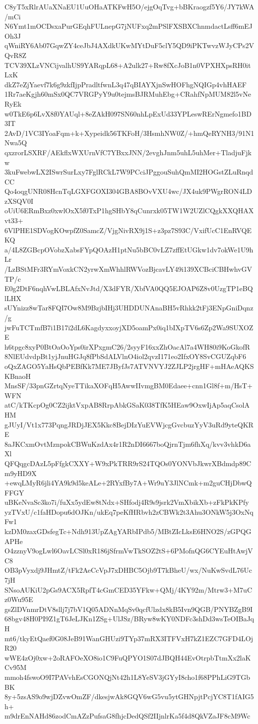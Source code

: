 C8yT5xRlrAUaXNaEU1UuOHaATKFwH5O/ejgOqTvg+bBKraogzf5Y6/JY7kWA/mCi
N6Ymt1mOCDsxaPurGEqhFULnepG7jNUFxq2mPSlFXSBXChnmdactLsff6mEJOh3J
qWniRY6Ab07GqwZY4ceJbJ4AXdkUKwMYtDuF5clY5QD9iPKTwvzWJyCPs2VQvR8Z
TCV39XLzVNCijvalhUS9YARqpL68+A2ulk27+Rw8fXcJoB1n0VPXHXpsRH0itLxK
dkZ7eZjYaevf7k6g9zkfIjpPradltfwnL3q47qBIAYXjnSwHOFhgNQIGp4vhHAEF
1Rr7aeKgjh60mSx0QC7VRGPyY9u0tejmsBJRMuhEbg+CRahfNpMUM82l5vNeRyEk
w0TkE6p6LvX8f0YAUql+8eZAkH097SN60nhLpExUd33YPLeswRErNgmefo1BD3IT
2AvD/1VC3IYoaFqm+k+Xypeidk56TKFoH/3HsmhNW0Z/+hmQeRYNH3/91N1Nwa5Q
qxzrorLSXRF/AEkflxWXUrnVfC7YBxxJNN/2evghJnm5uhL5uhMer+TladjuFjkw
3kuFwebwLX2ISwrSurLxy7FglRCkL7W9PCciJPggouSuhQmMI2HOGstZLuRnqdCC
Qo4oqgUNR08HcnTqLGXFGOXI304GBA8BOvVXU4wc/JX4uk9PWgrRON4LDzXSQV0I
oUiU6ERmBxz0xwlOxX5f0TxP1hgSHbY8qCunrxk05TW1W2UZlCQgkXXQHAXvt33+
6VlPHE1SDVogKOwpfZ0SamcZ/VjgNivRX9j1S+z3pz7S93C/VxifUcC1EnRVQEKQ
a/4L8ZGBcpOVobzXabsFYpQOAzH1ptNu5bBC0vLZ7zffEtUGkw1dv7okWe1U9hLr
/LzBStMFr3RYmVoxkCN2yrwXmWhhlRWVozBjcavLY49i139XCBciCBHwhvGVTP/c
E0g2DtF6nqhVwLBLAfxNvJtd/X3dFYR/XbfVA0QQ5EJOAP6Z8v0UzgTP1eBQlLHX
sUYnizz8wTar8FQI7Ow8M9BzjbIHj3UHDDUNAnaBH5vRhkk2tFj3ENpGniDqnz/g
jwFuTCTmfB7i1B17i2dL6KagdyxxoyjXD5oamPx0iq1bIXpTV6s6Zp2Wa9SUXOZE
h6tpgc8xyP0BtOaOoYps0irXPxgmC26/2syyF16xxZhOacAl7a4WH80i9KoGkofR
8NlEUdvdpBt1yjJnuHGJq8fPbSdALVlnO4iol2qvzI171eo2IfxOY8SvCGUZqbF6
oQxZAGO5YaHsQbPEBfKk7ME7JByfJs7ATVNVYJ2ZJLP2jrgHF+mHAeAQKSKBnaoH
MnsSF/33pnGZrtqNyeTTikaXOFqH5AwwIIvmgBM0Edaee+cnn1Gl8f+m/HsT+WFN
atC/kTKcpOg0CZ2ijktVxpAB8RrpAbkGSaK038TfK5HEaw9OxwIjAp5aqCsolAHM
gJUyI/Vt1x773PqngJRDjJEX5Kkc8BejDIzYuEVWjcgGvcbuzYyV3uRd9yteQKRE
8aJKCxmOvtMznpokCBWuKzdAx4r1R2nDI6667boQjrnTjm6fhXq/kvv3vhkD6aXl
QFQqgcDAzL5pFfgkCXXY+W9xPkTRR9rS24TQOs0YONVbJkwrXBdmdp89Cm9yHD9X
+ewqLMyR6jli4YA9k9d5keALe+2RYxfBy7A+Wr9uY3JlNCmk+m2guCHjDbwQFFGY
uBKeNvaSc3ko7i/fuXx5ydEw8tNdx+SHfodj4R9s9jsrk2VmXbikXb+zFkPkKPfy
yzTVxU/c1faHDopu6dOJKn/ukEq7peKfHRbvh2zCBWk2t3Ahu3ONkW5j3OxNqFw1
kzDM0zaxGDsfegTc+Ndh913UpZAgYARbIPdb5/MBtZIcLksE6HNO2S/zGPQGAPHe
O4zznyV9ogLwl6OavLCSl0xR186jSfrmVwTkSOZ2tS+6PMofnQG6CYEuHtAwjVC8
OB3pVyxdj9JHmtZ/tFk2AeCcVpJ7xDHBC5Ojb9T7kBheU/wx/NuKwSvdL76Uc7jH
SNsoAUKiU2pGs9ACX5RpfT4cGmCED35YFkw+QMj/4KY92m/Mtrw3+M7uCz0Wu95E
gsZlDVnmrDtV8sllj7j7bV1Q05ADNnMqSv0qcfUlzdx8kB5Ivn9QGB/PNYBZgB9I
68bgv48H0PI9Z1gT6JeLJKn1ZSg+UlJSz/BRyw8wKY0NDFc3shDd3wsTeOIBaJqH
mt6/tkyEtQaef0G08JeB91WanGHUzi9TYp37mRX3ITFVxH7kZ1EZC7GFD4LOjR20
wWE4zOj0xw+2oRAFOeXO8io1C9FuQPYO1S07dJBQH44EvOtrpbTtmXx2laKCv95M
mmoh4fswoO9I7PAVvhEsCGONQjNt42h1L8YeSV3jGYyI8cho1f68PPhLiG9TGbBK
8y+5zsAS9o9wjDZvwOmZF/dkesjwAk8GQV6wG5vu5ytGHNpjtPcjYC8T1fAIG5h+
m9drEnNAHd86zodCmAZzPufsaG8fhjcDedQSf2IIjnlrKa5f4d8QkVZaJF8cM9Wc
